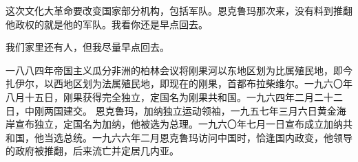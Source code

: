 这次文化大革命要改变国家部分机构，包括军队。恩克鲁玛那次来，没有料到推翻他政权的就是他的军队。我看你还是早点回去。

我们家里还有人，但我尽量早点回去。

\begin{maonote}
一八八四年帝国主义瓜分非洲的柏林会议将刚果河以东地区划为比属殖民地，即今扎伊尔，以西地区划为法属殖民地，即现在的刚果，首都布拉柴维尔。一九六〇年八月十五日，刚果获得完全独立，定国名为刚果共和国。一九六四年二月二十二日，中刚两国建交。
恩克鲁玛，加纳独立运动领袖，一九五七年三月六日黄金海岸宣布独立，定国名为加纳，他被选为总理。一九六〇年七月一日宣布成立加纳共和国，他当选总统。一九六六年二月恩克鲁玛访问中国时，恰逢国内政变，他领导的政府被推翻，后来流亡并定居几内亚。
\end{maonote}
